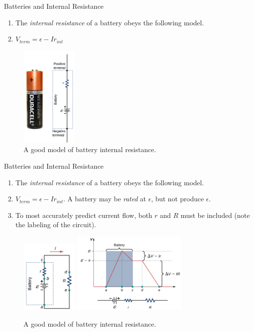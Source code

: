 \documentclass{beamer}
\begin{document}
\begin{frame}{Batteries and Internal Resistance}
\small
\begin{enumerate}
\item The \textit{internal resistance} of a battery obeys the following model.
\item $V_{term} = \epsilon - I r_{int}$
\end{enumerate}
\begin{figure}
\centering
\includegraphics[width=0.25\textwidth]{figures/batt3.png}
\caption{\label{fig:batt3} A good model of battery internal resistance.}
\end{figure}
\end{frame}

\begin{frame}{Batteries and Internal Resistance}
\small
\begin{enumerate}
\item The \textit{internal resistance} of a battery obeys the following model.
\item $V_{term} = \epsilon - I r_{int}$.  A battery may be \textit{rated} at $\epsilon$, but not produce $\epsilon$.
\item To most accurately predict current flow, both $r$ and $R$ must be included (note the labeling of the circuit).
\end{enumerate}
\begin{figure}
\centering
\includegraphics[width=0.25\textwidth]{figures/batt4.png}
\includegraphics[width=0.5\textwidth]{figures/batt5.png}
\caption{\label{fig:batt4} A good model of battery internal resistance.}
\end{figure}
\end{frame}
\end{document}
